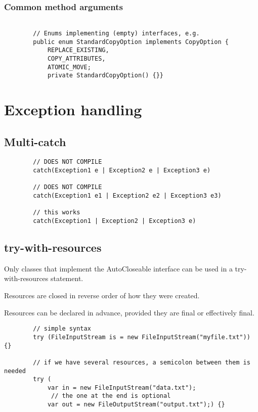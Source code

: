 \documentclass{scrartcl}
\begin{document}
\subsubsection{Common method arguments}

    \begin{lstlisting}

        // Enums implementing (empty) interfaces, e.g.
        public enum StandardCopyOption implements CopyOption {
            REPLACE_EXISTING,
            COPY_ATTRIBUTES,
            ATOMIC_MOVE;
            private StandardCopyOption() {}}

    \end{lstlisting}

\section{Exception handling}
\subsection{Multi-catch}


    \begin{lstlisting}
        // DOES NOT COMPILE
        catch(Exception1 e | Exception2 e | Exception3 e)

        // DOES NOT COMPILE
        catch(Exception1 e1 | Exception2 e2 | Exception3 e3)

        // this works
        catch(Exception1 | Exception2 | Exception3 e)
    \end{lstlisting}

\subsection{try-with-resources}

    Only classes that implement the AutoCloseable interface can be used in a try-with-resources statement.

    Resources are closed in reverse order of how they were created.

    Resources can be declared in advance, provided they are final or effectively final.

    \begin{lstlisting}
        // simple syntax
        try (FileInputStream is = new FileInputStream("myfile.txt")) {}

        // if we have several resources, a semicolon between them is needed
        try (
            var in = new FileInputStream("data.txt");
             // the one at the end is optional
            var out = new FileOutputStream("output.txt");) {}
    \end{lstlisting}
\end{document}
